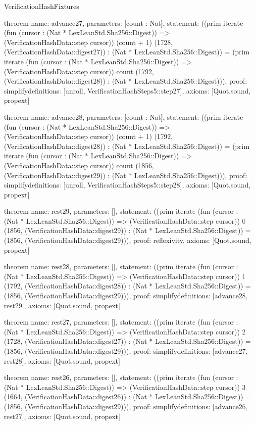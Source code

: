 \begin{lexlean}{VerificationHashFixtures}
\begin{semanticmodule}
theorem{
  name: advance27,
  parameters: [count : Nat],
  statement: ((prim iterate (fun (cursor : (Nat * LexLeanStd.Sha256::Digest)) => (VerificationHashData::step cursor)) (count + 1) (1728, (VerificationHashData::digest27)) : (Nat * LexLeanStd.Sha256::Digest)) = (prim iterate (fun (cursor : (Nat * LexLeanStd.Sha256::Digest)) => (VerificationHashData::step cursor)) count (1792, (VerificationHashData::digest28)) : (Nat * LexLeanStd.Sha256::Digest))),
  proof: simplify{definitions: [unroll, VerificationHashSteps5::step27]},
  axioms: [Quot.sound, propext]
}

theorem{
  name: advance28,
  parameters: [count : Nat],
  statement: ((prim iterate (fun (cursor : (Nat * LexLeanStd.Sha256::Digest)) => (VerificationHashData::step cursor)) (count + 1) (1792, (VerificationHashData::digest28)) : (Nat * LexLeanStd.Sha256::Digest)) = (prim iterate (fun (cursor : (Nat * LexLeanStd.Sha256::Digest)) => (VerificationHashData::step cursor)) count (1856, (VerificationHashData::digest29)) : (Nat * LexLeanStd.Sha256::Digest))),
  proof: simplify{definitions: [unroll, VerificationHashSteps5::step28]},
  axioms: [Quot.sound, propext]
}

theorem{
  name: rest29,
  parameters: [],
  statement: ((prim iterate (fun (cursor : (Nat * LexLeanStd.Sha256::Digest)) => (VerificationHashData::step cursor)) 0 (1856, (VerificationHashData::digest29)) : (Nat * LexLeanStd.Sha256::Digest)) = (1856, (VerificationHashData::digest29))),
  proof: reflexivity{},
  axioms: [Quot.sound, propext]
}

theorem{
  name: rest28,
  parameters: [],
  statement: ((prim iterate (fun (cursor : (Nat * LexLeanStd.Sha256::Digest)) => (VerificationHashData::step cursor)) 1 (1792, (VerificationHashData::digest28)) : (Nat * LexLeanStd.Sha256::Digest)) = (1856, (VerificationHashData::digest29))),
  proof: simplify{definitions: [advance28, rest29]},
  axioms: [Quot.sound, propext]
}

theorem{
  name: rest27,
  parameters: [],
  statement: ((prim iterate (fun (cursor : (Nat * LexLeanStd.Sha256::Digest)) => (VerificationHashData::step cursor)) 2 (1728, (VerificationHashData::digest27)) : (Nat * LexLeanStd.Sha256::Digest)) = (1856, (VerificationHashData::digest29))),
  proof: simplify{definitions: [advance27, rest28]},
  axioms: [Quot.sound, propext]
}

theorem{
  name: rest26,
  parameters: [],
  statement: ((prim iterate (fun (cursor : (Nat * LexLeanStd.Sha256::Digest)) => (VerificationHashData::step cursor)) 3 (1664, (VerificationHashData::digest26)) : (Nat * LexLeanStd.Sha256::Digest)) = (1856, (VerificationHashData::digest29))),
  proof: simplify{definitions: [advance26, rest27]},
  axioms: [Quot.sound, propext]
}


\end{semanticmodule}
\end{lexlean}
